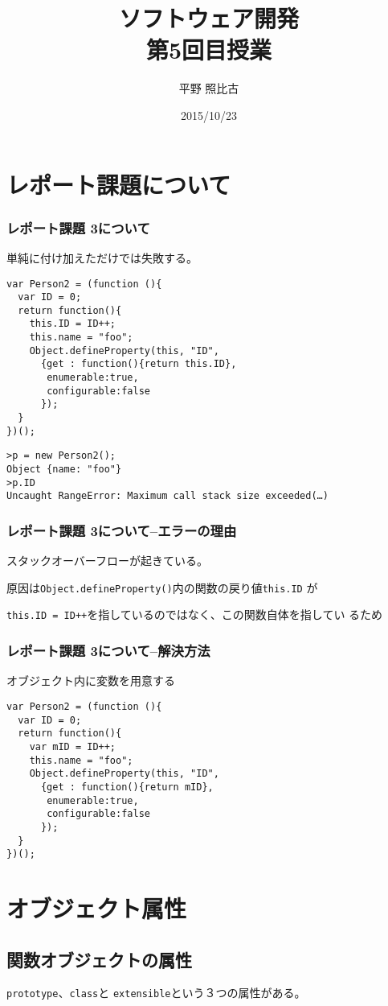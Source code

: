 \documentclass[dvipsk]{beamer}
\title{ソフトウェア開発\\第5回目授業}
\author{平野 照比古}
\institute{}
\date{2015/10/23}
\begin{document}
\frame{\maketitle}
\section{レポート課題について}
\begin{frame}[containsverbatim]
 \frametitle{レポート課題 3について}
 単純に付け加えただけでは失敗する。
 {\small
\begin{verbatim}
var Person2 = (function (){
  var ID = 0;
  return function(){
    this.ID = ID++;
    this.name = "foo";
    Object.defineProperty(this, "ID",
      {get : function(){return this.ID},
       enumerable:true,
       configurable:false
      });
  }
})();
\end{verbatim}
 
\begin{verbatim}
>p = new Person2();
Object {name: "foo"}
>p.ID
Uncaught RangeError: Maximum call stack size exceeded(…)
\end{verbatim}
 }
 \end{frame} 
\begin{frame}[containsverbatim]
 \frametitle{レポート課題 3について--エラーの理由}
 スタックオーバーフローが起きている。

 原因は\texttt{Object.defineProperty()}内の関数の戻り値\texttt{this.ID}
 が

 \texttt{this.ID = ID++}を指しているのではなく、この関数自体を指してい
 るため
\end{frame}
\begin{frame}[containsverbatim]
 \frametitle{レポート課題 3について--解決方法}
 オブジェクト内に変数を用意する
\begin{verbatim}
var Person2 = (function (){
  var ID = 0;
  return function(){
    var mID = ID++;
    this.name = "foo";
    Object.defineProperty(this, "ID",
      {get : function(){return mID},
       enumerable:true,
       configurable:false
      });
  }
})();
\end{verbatim}
\end{frame}
\newcommand{\ElmJ}[1]{\texttt{#1}}
\section{オブジェクト属性}
\subsection{関数オブジェクトの属性}
\begin{frame}[containsverbatim]
\texttt{prototype}、\texttt{class}と
 \texttt{extensible}という３つの属性がある。
\end{frame}
\end{document}
